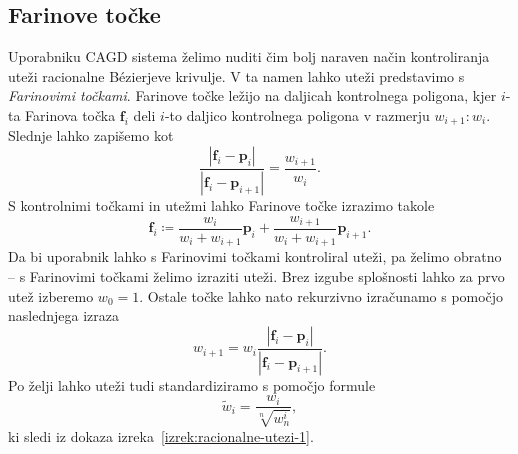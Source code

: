 \documentclass[isrm2, tisk]{fmfdelo}
\newcommand{\p}{\mathbf{p}}
\begin{document}
    \subsection{Farinove točke}
    Uporabniku CAGD sistema želimo nuditi čim bolj naraven način kontroliranja uteži racionalne Bézierjeve krivulje.
    V ta namen lahko uteži predstavimo s \textit{Farinovimi točkami}.
    Farinove točke ležijo na daljicah kontrolnega poligona, kjer $i$-ta Farinova točka $\mathbf{f}_i$ deli $i$-to daljico kontrolnega poligona v razmerju $w_{i+1}:w_{i}$.
    Slednje lahko zapišemo kot \[\frac{|\mathbf{f}_i-\p_i|}{|\mathbf{f}_i-\p_{i+1}|} = \frac{w_{i+1}}{w_{i}}.\]
    S kontrolnimi točkami in utežmi lahko Farinove točke izrazimo takole
    \[\mathbf{f}_i \coloneqq \frac{w_{i}}{w_{i}+w_{i+1}}\p_i +  \frac{w_{i+1}}{w_{i}+w_{i+1}}\p_{i+1}.\]
    Da bi uporabnik lahko s Farinovimi točkami kontroliral uteži, pa želimo obratno – s Farinovimi točkami želimo izraziti uteži.
    Brez izgube splošnosti lahko za prvo utež izberemo $w_0=1$.
    Ostale točke lahko nato rekurzivno izračunamo s pomočjo naslednjega izraza
    \[w_{i+1} = w_i\frac{|\mathbf{f}_i-\p_i|}{|\mathbf{f}_i-\p_{i+1}|}.\]
    Po želji lahko uteži tudi standardiziramo s pomočjo formule \[\tilde{w}_{i} = \frac{w_i}{\sqrt[n]{w_n^i}},\]
    ki sledi iz dokaza izreka~\ref{izrek:racionalne-utezi-1}.
\end{document}
